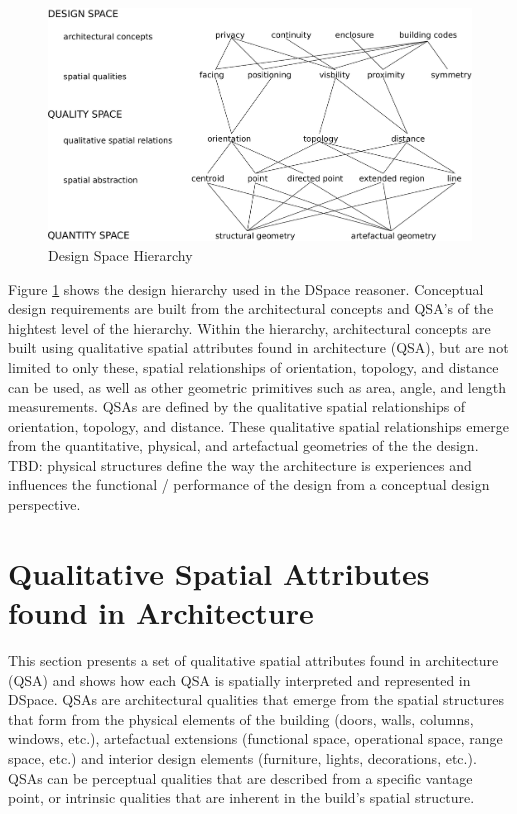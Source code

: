 \documentclass[12pt]{ucthesis}
\begin{document}
\begin{figure}[H]
\centering
\includegraphics[width=140mm]{hierarchy2}
\caption{Design Space Hierarchy}
\label{hierarchy}
\end{figure}

Figure \ref{hierarchy} shows the design hierarchy used in the DSpace reasoner. Conceptual design requirements are built from the architectural concepts and QSA's of the hightest level of the hierarchy. Within the hierarchy, architectural concepts are built using qualitative spatial attributes found in architecture (QSA), but are not limited to only these, spatial relationships of orientation, topology, and distance can be used, as well as other geometric primitives such as area, angle, and length measurements. QSAs are defined by the qualitative spatial relationships of orientation, topology, and distance. These qualitative spatial relationships emerge from the quantitative, physical, and artefactual geometries of the the design. TBD: physical structures define the way the architecture is experiences and influences the functional / performance of the design from a conceptual design perspective.


\section{Qualitative Spatial Attributes found in Architecture}
This section presents a set of qualitative spatial attributes found in architecture (QSA) and shows how each QSA is spatially interpreted and represented in DSpace. QSAs are architectural qualities that emerge from the spatial structures that form from the physical elements of the building (doors, walls, columns, windows, etc.), artefactual extensions (functional space, operational space, range space, etc.) and interior design elements (furniture, lights, decorations, etc.). QSAs can be perceptual qualities that are described from a specific vantage point, or intrinsic qualities that are inherent in the build's spatial structure. 
\end{document}
